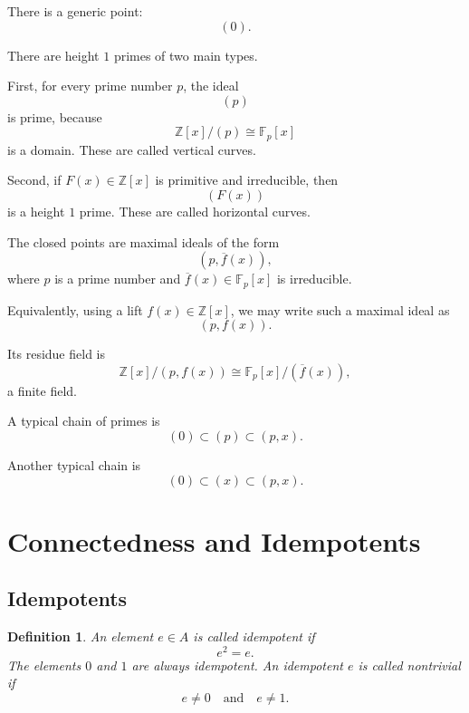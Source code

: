 \documentclass[12pt,a4paper]{article}
\newtheorem{definition}{Definition}[section]
\newcommand{\Z}{\mathbb{Z}}
\newcommand{\Fp}{\mathbb F_p}
\begin{document}
There is a generic point:
\[
(0).
\]

There are height \(1\) primes of two main types.

First, for every prime number \(p\), the ideal
\[
(p)
\]
is prime, because
\[
\Z[x]/(p)\cong\Fp[x]
\]
is a domain. These are called vertical curves.

Second, if \(F(x)\in\Z[x]\) is primitive and irreducible, then
\[
(F(x))
\]
is a height \(1\) prime. These are called horizontal curves.

The closed points are maximal ideals of the form
\[
(p,\overline f(x)),
\]
where \(p\) is a prime number and \(\overline f(x)\in\Fp[x]\) is irreducible.

Equivalently, using a lift \(f(x)\in\Z[x]\), we may write such a maximal ideal as
\[
(p,f(x)).
\]

Its residue field is
\[
\Z[x]/(p,f(x))
\cong
\Fp[x]/(\overline f(x)),
\]
a finite field.

A typical chain of primes is
\[
(0)\subset (p)\subset (p,x).
\]

Another typical chain is
\[
(0)\subset (x)\subset (p,x).
\]

\begin{center}
\end{center}

\section{Connectedness and Idempotents}

\subsection{Idempotents}

\begin{definition}
	An element \(e\in A\) is called idempotent if
	\[
	e^2=e.
	\]
	The elements \(0\) and \(1\) are always idempotent. An idempotent \(e\) is called
	nontrivial if
	\[
	e\neq 0
	\quad\text{and}\quad
	e\neq 1.
	\]
\end{definition}
\end{document}

